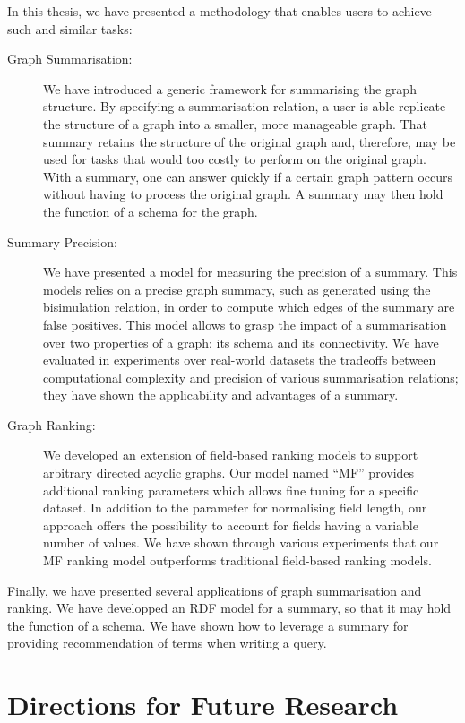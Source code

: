 In this thesis, we have presented a methodology that enables users to achieve such and similar tasks:
\begin{description}
	\item[Graph Summarisation:] We have introduced a generic framework for summarising the graph structure. By specifying a summarisation relation, a user is able replicate the structure of a graph into a smaller, more manageable graph. That summary retains the structure of the original graph and, therefore, may be used for tasks that would too costly to perform on the original graph. With a summary, one can answer quickly if a certain graph pattern occurs without having to process the original graph. A summary may then hold the function of a schema for the graph.
	\item[Summary Precision:] We have presented a model for measuring the precision of a summary. This models relies on a precise graph summary, such as generated using the bisimulation relation, in order to compute which edges of the summary are false positives. This model allows to grasp the impact of a summarisation over two properties of a graph: its schema and its connectivity. We have evaluated in experiments over real-world datasets the tradeoffs between computational complexity and precision of various summarisation relations; they have shown the applicability and advantages of a summary.
	\item[Graph Ranking:] We developed an extension of field-based ranking models to support arbitrary directed acyclic graphs. Our model named ``MF'' provides additional ranking parameters which allows fine tuning for a specific dataset. In addition to the parameter for normalising field length, our approach offers the possibility to account for fields having a variable number of values. We have shown through various experiments that our MF ranking model outperforms traditional field-based ranking models.
\end{description}
Finally, we have presented several applications of graph summarisation and ranking. We have developped an RDF model for a summary, so that it may hold the function of a schema. We have shown how to leverage a summary for providing recommendation of terms when writing a query.

\section{Directions for Future Research}

